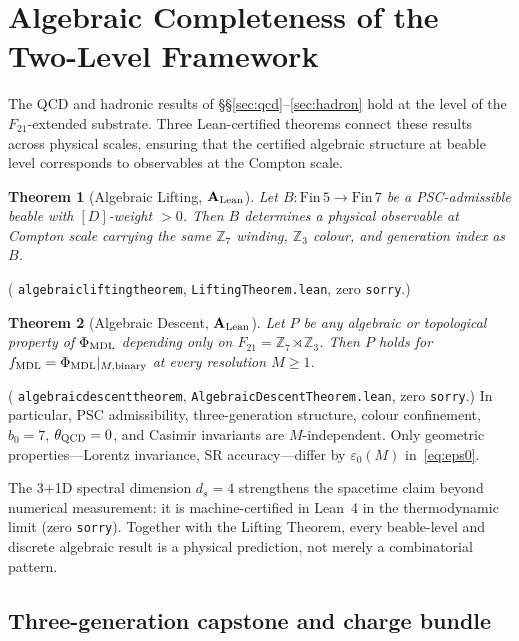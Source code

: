 \documentclass[11pt]{article}
\newtheorem{theorem}{Theorem}[section]
\theoremstyle{remark}
\newcommand{\ZS}{\mathbb{Z}_7}
\newcommand{\Zthree}{\mathbb{Z}_3}
\newcommand{\fmdl}{f_{\rm MDL}}
\newcommand{\lean}[1]{%
  \penalty-100
  \begingroup\def\_{\textunderscore\allowbreak}\texttt{#1}\endgroup}
\newcommand{\phimdl}{\Phi_{\rm MDL}}
\newcommand{\Ftwentyone}{F_{21}}
\newcommand{\epszero}{\varepsilon_0}
\newcommand{\CatAL}{\ensuremath{\textbf{A}_{\rm Lean}}}
\begin{document}
\section{Algebraic Completeness of the Two-Level Framework}
\label{sec:algebraic}

The QCD and hadronic results of \S\S\ref{sec:qcd}--\ref{sec:hadron} hold at the level of the $\Ftwentyone$-extended substrate.
Three Lean-certified theorems connect these results across physical scales, ensuring that
the certified algebraic structure at beable level corresponds to observables at the Compton scale.

\begin{theorem}[Algebraic Lifting, $\CatAL$]
\label{thm:lifting}
Let $B : \text{Fin}\,5 \to \text{Fin}\,7$ be a PSC-admissible beable with
$[D]$-weight $> 0$.
Then $B$ determines a physical observable at Compton scale carrying the same
$\ZS$ winding, $\Zthree$ colour, and generation index as $B$.
\end{theorem}
\noindent
(\lean{algebraic\_lifting\_theorem}, \texttt{LiftingTheorem.lean}, zero \texttt{sorry}.)

\begin{theorem}[Algebraic Descent, $\CatAL$]
\label{thm:descent}
Let $P$ be any algebraic or topological property of $\phimdl$ depending only on
$\Ftwentyone = \ZS \rtimes \Zthree$.
Then $P$ holds for $\fmdl = \phimdl|_{M,{\rm binary}}$ at every resolution $M \geq 1$.
\end{theorem}
\noindent
(\lean{algebraic\_descent\_theorem}, \texttt{AlgebraicDescentTheorem.lean}, zero \texttt{sorry}.)
In particular, PSC admissibility, three-generation structure, colour confinement,
$b_0 = 7$, $\theta_{\rm QCD} = 0$, and Casimir invariants are $M$-independent.
Only geometric properties---Lorentz invariance, SR accuracy---differ by
$\epszero(M)$ in~\eqref{eq:eps0}.

The 3+1D spectral dimension $d_s = 4$ strengthens the spacetime claim beyond
numerical measurement: it is machine-certified in Lean~4 in the thermodynamic limit (zero \texttt{sorry}).
Together with the Lifting Theorem, every beable-level and discrete algebraic result
is a physical prediction, not merely a combinatorial pattern.

\subsection{Three-generation capstone and charge bundle}
\end{document}
